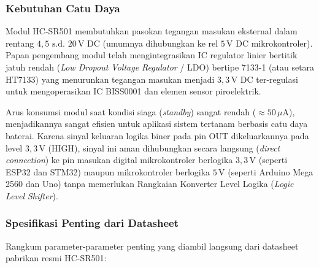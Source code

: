 \subsubsection{Kebutuhan Catu Daya}
Modul HC-SR501 membutuhkan pasokan tegangan masukan eksternal dalam rentang $4{,}5\text{ s.d. }20\,\text{V DC}$ (umumnya dihubungkan ke rel $5\,\text{V DC}$ mikrokontroler). Papan pengembang modul telah mengintegrasikan IC regulator linier bertitik jatuh rendah (\textit{Low Dropout Voltage Regulator} / LDO) bertipe 7133-1 (atau setara HT7133) yang menurunkan tegangan masukan menjadi $3{,}3\,\text{V DC}$ ter-regulasi untuk mengoperasikan IC BISS0001 dan elemen sensor piroelektrik.

Arus konsumsi modul saat kondisi siaga (\textit{standby}) sangat rendah ($\approx 50\,\mu\text{A}$), menjadikannya sangat efisien untuk aplikasi sistem tertanam berbasis catu daya baterai. Karena sinyal keluaran logika biner pada pin OUT dikeluarkannya pada level $3{,}3\,\text{V}$ (HIGH), sinyal ini aman dihubungkan secara langsung (\textit{direct connection}) ke pin masukan digital mikrokontroler berlogika $3{,}3\,\text{V}$ (seperti ESP32 dan STM32) maupun mikrokontroler berlogika $5\,\text{V}$ (seperti Arduino Mega 2560 dan Uno) tanpa memerlukan Rangkaian Konverter Level Logika (\textit{Logic Level Shifter}).

\subsubsection{Spesifikasi Penting dari Datasheet}
Rangkum parameter-parameter penting yang diambil langsung dari datasheet pabrikan resmi HC-SR501:

